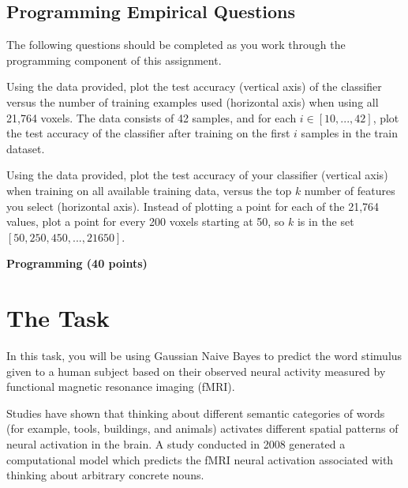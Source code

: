 \documentclass[11pt,addpoints,answers]{exam}
\begin{document}
\begin{questions}
\section{Programming Empirical Questions}

The following questions should be completed as you work through the programming component of this assignment.

\begin{questions}

\question[4] Using the data provided, plot the test accuracy (vertical axis) of the classifier versus the number of training examples used (horizontal axis) when using all 21,764 voxels. The data consists of 42 samples, and for each $i \in [10,...,42]$, plot the test accuracy of the classifier after training on the first $i$ samples in the train dataset.

\begin{your_solution}[title=Your Answer:,height=10cm,width=15cm]
\end{your_solution}

\clearpage

\question[4] Using the data provided, plot the test accuracy of your classifier (vertical axis) when training on all available training data, versus the top $k$ number of features you select (horizontal axis). Instead of plotting a point for each of the 21,764 values, plot a point for every 200 voxels starting at 50, so $k$ is in the set $[50,250,450,...,21650]$.

\begin{your_solution}[title=Your Answer:,height=10cm,width=15cm]
\end{your_solution}

\end{questions}
\newpage
\end{questions}

{\LARGE \bf Programming (40 points)}


\section{The Task}
In this task, you will be using Gaussian Naive Bayes to predict the word stimulus given to a human subject based on their observed neural activity measured by functional magnetic resonance imaging (fMRI). 

Studies have shown that thinking about different semantic categories of words (for example, tools, buildings, and animals) activates different spatial patterns of neural activation in the brain. A study conducted in 2008 generated a computational model which predicts the fMRI neural activation associated with thinking about arbitrary concrete nouns.  
\end{document}
